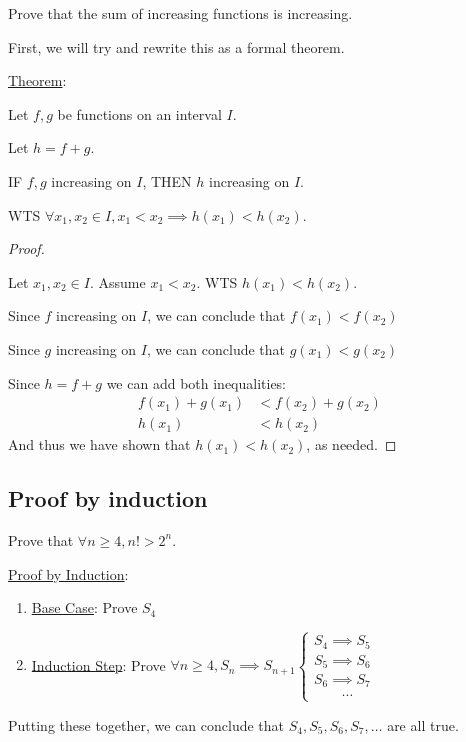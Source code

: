 Prove that the sum of increasing functions is increasing.

First, we will try and rewrite this as a formal theorem.

\begin{mdframed}
  \underline{Theorem}:

  Let \(f, g\) be functions on an interval \(I\).

  Let \(h = f + g\).

  IF \(f, g\) increasing on \(I\), THEN \(h\) increasing on \(I\).
\end{mdframed}

WTS \(\forall x_{1}, x_{2} \in I, x_{1} < x_{2} \implies h(x_{1}) < h(x_{2})\).

\begin{proof} \(\)

  Let \(x_{1}, x_{2} \in I\). Assume \(x_{1} < x_{2}\). WTS \(h(x_{1}) < h(x_{2})\).

  Since \(f\) increasing on \(I\), we can conclude that \(f(x_{1}) < f(x_{2})\)

  Since \(g\) increasing on \(I\), we can conclude that \(g(x_{1}) < g(x_{2})\)

  Since \(h = f + g\) we can add both inequalities:
  \begin{align*}
    f(x_{1}) + g(x_{1}) &< f(x_{2}) + g(x_{2}) \\
    h(x_{1}) &< h(x_{2})
  \end{align*}
  And thus we have shown that \(h(x_{1}) < h(x_{2})\), as needed. \qedhere
\end{proof}

\subsection{Proof by induction}

Prove that \(\forall n \geq 4, n! > 2^{n}\).

\begin{mdframed}

  \underline{Proof by Induction}:

  \begin{enumerate}
    \item \underline{Base Case}: Prove \(S_{4}\)
    \item \underline{Induction Step}: Prove \(\forall n \geq 4, S_{n} \implies S_{n + 1} \begin{cases} S_{4} \implies S_{5} \\ S_{5} \implies S_{6} \\ S_{6} \implies S_{7} \\ \qquad \cdots \end{cases}\)
  \end{enumerate}

  Putting these together, we can conclude that \(S_{4}, S_{5}, S_{6}, S_{7}, \dots\) are all true.
\end{mdframed}

